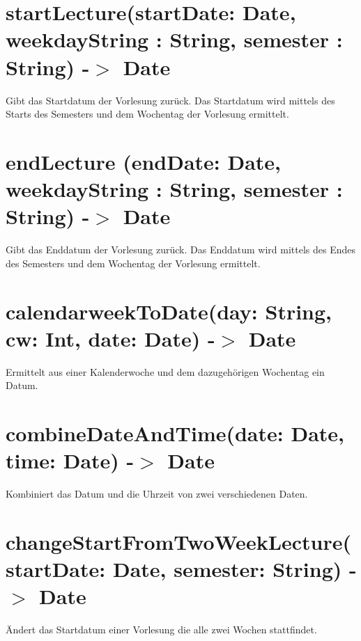 \section{startLecture(startDate: Date, weekdayString : String, semester : String) -$>$ Date}
Gibt das Startdatum der Vorlesung zurück. Das Startdatum wird mittels des Starts des Semesters und dem Wochentag der Vorlesung ermittelt.

\section{endLecture (endDate: Date, weekdayString : String, semester : String) -$>$ Date}
Gibt das Enddatum der Vorlesung zurück. Das Enddatum wird mittels des Endes des Semesters und dem Wochentag der Vorlesung ermittelt.

\section{calendarweekToDate(day: String, cw: Int, date: Date) -$>$ Date}
Ermittelt aus einer Kalenderwoche und dem dazugehörigen Wochentag ein Datum.

\section{combineDateAndTime(date: Date, time: Date) -$>$ Date}
Kombiniert das Datum und die Uhrzeit von zwei verschiedenen Daten.

\section{changeStartFromTwoWeekLecture(startDate: Date, semester: String) -$>$ Date}
Ändert das Startdatum einer Vorlesung die alle zwei Wochen stattfindet.
